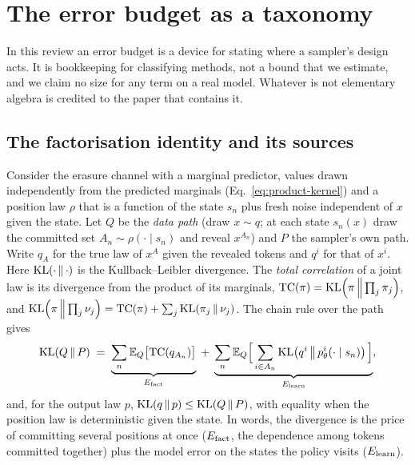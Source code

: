 \section{The error budget as a taxonomy}
\label{sec:budget}

In this review an error budget is a device for stating where a sampler's design acts. It is bookkeeping for classifying methods, not a bound that we estimate, and we claim no size for any term on a real model. Whatever is not elementary algebra is credited to the paper that contains it. %

\subsection{The factorisation identity and its sources}
\label{sec:budget-identity}

Consider the erasure channel with a marginal predictor, values drawn independently from the predicted marginals (Eq.~\eqref{eq:product-kernel}) and a position law $\rho$ that is a function of the state $s_n$ plus fresh noise independent of $x$ given the state. Let $Q$ be the \emph{data path} (draw $x\sim q$; at each state $s_n(x)$ draw the committed set $A_n\sim\rho(\cdot\mid s_n)$ and reveal $x^{A_n}$) and $P$ the sampler's own path. Write $q_A$ for the true law of $x^A$ given the revealed tokens and $q^i$ for that of $x^i$. Here $\mathrm{KL}\!\left(\cdot\,\middle\|\,\cdot\right)$ is the Kullback--Leibler divergence. The \emph{total correlation} of a joint law is its divergence from the product of its marginals, $\mathrm{TC}(\pi)=\mathrm{KL}\!\left(\pi\,\middle\|\,\prod_j\pi_j\right)$, and $\mathrm{KL}\!\left(\pi\,\middle\|\,\prod_j\nu_j\right)=\mathrm{TC}(\pi)+\sum_j\mathrm{KL}\!\left(\pi_j\,\middle\|\,\nu_j\right)$. The chain rule over the path gives
\begin{equation}
  \mathrm{KL}\!\left(Q\,\middle\|\,P\right)\;=\;\underbrace{\sum_n\mathbb E_Q\big[\mathrm{TC}(q_{A_n})\big]}_{E_{\mathrm{fact}}}
  \;+\;\underbrace{\sum_n\mathbb E_Q\Big[\sum_{i\in A_n}\mathrm{KL}\!\left(q^i\,\middle\|\,p_\theta^i(\cdot\mid s_n)\right)\Big]}_{E_{\mathrm{learn}}},
  \label{eq:identity}
\end{equation}
and, for the output law $p$, $\mathrm{KL}\!\left(q\,\middle\|\,p\right)\le\mathrm{KL}\!\left(Q\,\middle\|\,P\right)$, with equality when the position law is deterministic given the state. In words, the divergence is the price of committing several positions at once ($E_{\mathrm{fact}}$, the dependence among tokens committed together) plus the model error on the states the policy visits ($E_{\mathrm{learn}}$). %


